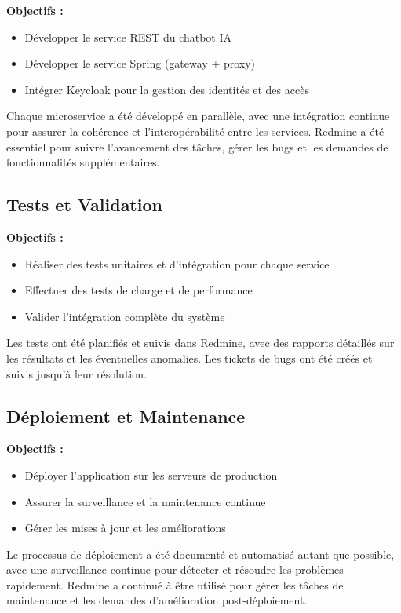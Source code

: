 \documentclass[a4paper, 11pt, openany]{report}
\begin{document}
\textbf{Objectifs :}
\begin{itemize}
    \item Développer le service REST du chatbot IA
    \item Développer le service Spring (gateway + proxy)
    \item Intégrer Keycloak pour la gestion des identités et des accès
\end{itemize}

Chaque microservice a été développé en parallèle, avec une intégration continue pour assurer la cohérence et l'interopérabilité entre les services. Redmine a été essentiel pour suivre l'avancement des tâches, gérer les bugs et les demandes de fonctionnalités supplémentaires.

\subsection{Tests et Validation}

\textbf{Objectifs :}
\begin{itemize}
    \item Réaliser des tests unitaires et d'intégration pour chaque service
    \item Effectuer des tests de charge et de performance
    \item Valider l'intégration complète du système
\end{itemize}

Les tests ont été planifiés et suivis dans Redmine, avec des rapports détaillés sur les résultats et les éventuelles anomalies. Les tickets de bugs ont été créés et suivis jusqu'à leur résolution.

\subsection{Déploiement et Maintenance}

\textbf{Objectifs :}
\begin{itemize}
    \item Déployer l'application sur les serveurs de production
    \item Assurer la surveillance et la maintenance continue
    \item Gérer les mises à jour et les améliorations
\end{itemize}

Le processus de déploiement a été documenté et automatisé autant que possible, avec une surveillance continue pour détecter et résoudre les problèmes rapidement. Redmine a continué à être utilisé pour gérer les tâches de maintenance et les demandes d'amélioration post-déploiement.
\end{document}
